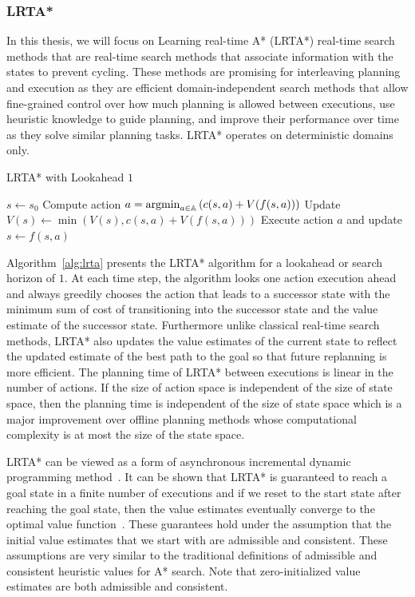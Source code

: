 \subsubsection{LRTA*}
\label{sec:lrta}

In this thesis, we will focus on Learning real-time A* (LRTA*) real-time search methods
that are real-time search methods that associate information with the
states to prevent cycling. These methods are promising for
interleaving planning and execution as they are efficient
domain-independent search methods that allow fine-grained control over
how much planning is allowed between executions, use heuristic
knowledge to guide planning, and improve their performance over time
as they solve similar planning tasks. LRTA* operates on deterministic
domains only.

\begin{algorithm}[t]
  \caption{LRTA* with Lookahead $1$~\cite{DBLP:journals/ai/Korf90}}
  \begin{algorithmic}[1]
    \State $s \leftarrow s_0$
    \State Compute action $a = \operatorname*{argmin}_{a \in \mathbb{A}} \left( c(s, a) +
      V(f(s, a)) \right)$
    \State Update $V(s) \leftarrow \min\left( V(s), c(s, a) + V(f(s,
      a)) \right)$
    \State Execute action $a$ and update $s \leftarrow f(s, a)$
    \EndWhile
  \end{algorithmic}
  \label{alg:lrta}
\end{algorithm}

Algorithm~\ref{alg:lrta} presents the LRTA* algorithm for a lookahead
or search horizon of $1$. At each time step, the algorithm looks one
action execution ahead and always greedily chooses the action that
leads to a successor state with the minimum sum of cost of
transitioning into the successor state and the value estimate of the
successor state. Furthermore unlike classical real-time search
methods, LRTA* also updates the value estimates of the current state
to reflect the updated estimate of the best path to the goal so that
future replanning is more efficient. The planning time of LRTA*
between executions is linear in the number of actions. If the size of
action space is independent of the size of state space, then the
planning time is independent of the size of state space which is a
major improvement over offline planning methods whose computational
complexity is at most the size of the state space.

LRTA* can be viewed as a form of asynchronous incremental dynamic
programming method~\cite{DBLP:journals/ai/BartoBS95}. It can be shown
that LRTA* is guaranteed to reach a goal state in a finite number of
executions and if we reset to the start state after reaching the goal
state, then the value estimates eventually converge to the optimal
value function~\cite{DBLP:journals/ai/Korf90}. These guarantees hold
under the assumption that the initial value estimates that we start
with are admissible and consistent. These assumptions are very similar
to the traditional definitions of admissible and consistent heuristic
values for A* search. Note that zero-initialized value estimates are
both admissible and consistent.

